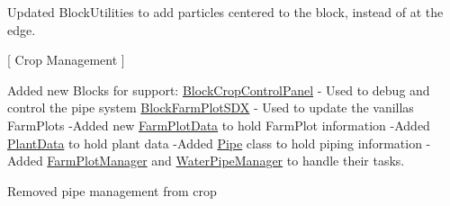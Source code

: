 Updated Block\+Utilities to add particles centered to the block, instead of at the edge.

\mbox{[} Crop Management \mbox{]}
\begin{DoxyItemize}
\item Added new Blocks for support\+: \mbox{\hyperlink{class_block_crop_control_panel}{Block\+Crop\+Control\+Panel}} -\/ Used to debug and control the pipe system \mbox{\hyperlink{class_block_farm_plot_s_d_x}{Block\+Farm\+Plot\+SDX}} -\/ Used to update the vanilla\textquotesingle{}s Farm\+Plots -\/Added new \mbox{\hyperlink{class_farm_plot_data}{Farm\+Plot\+Data}} to hold Farm\+Plot information -\/Added \mbox{\hyperlink{class_plant_data}{Plant\+Data}} to hold plant data -\/Added \mbox{\hyperlink{class_pipe}{Pipe}} class to hold piping information -\/Added \mbox{\hyperlink{class_farm_plot_manager}{Farm\+Plot\+Manager}} and \mbox{\hyperlink{class_water_pipe_manager}{Water\+Pipe\+Manager}} to handle their tasks.
\begin{DoxyItemize}
\item Removed pipe management from crop
\end{DoxyItemize}
\end{DoxyItemize}

